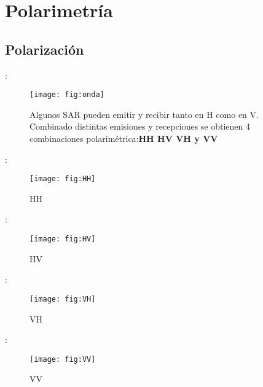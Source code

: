 \section{Polarimetría}
\subsection{Polarización}
\begin{frame}{\secname : \subsecname}
  \begin{figure}
    \centering
    \texttt{[image: fig:onda]}
    \caption{Algunos SAR pueden emitir y recibir tanto en H como en V. Combinado distintas emisiones y recepciones se obtienen 4 combinaciones polarimétrica:{\bf HH HV VH y VV}}
    \label{}
  \end{figure}
\end{frame}

\begin{frame}{\secname : \subsecname}
  \begin{figure}
    \centering
    \texttt{[image: fig:HH]}
    \caption{HH}
    \label{}
  \end{figure}
\end{frame}

\begin{frame}{\secname : \subsecname}
  \begin{figure}
    \centering
    \texttt{[image: fig:HV]}
    \caption{HV}
    \label{}
  \end{figure}
\end{frame}

\begin{frame}{\secname : \subsecname}
  \begin{figure}
    \centering
    \texttt{[image: fig:VH]}
    \caption{VH}
    \label{}
  \end{figure}
\end{frame}

\begin{frame}{\secname : \subsecname}
  \begin{figure}
    \centering
    \texttt{[image: fig:VV]}
    \caption{VV}
    \label{}
  \end{figure}
\end{frame}

